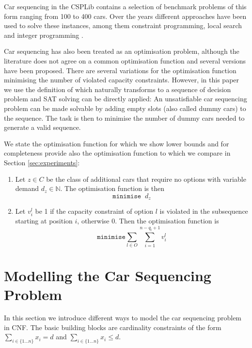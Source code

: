 \documentclass[]{easychair}
\def\min{{\texttt{minimise}}}
\begin{document}
Car sequencing in the CSPLib contains a selection of benchmark problems of this form ranging from 100 to 400 cars. Over
the years different approaches have been used to solve these instances, among them constraint programming, local search
and integer programming \cite{Regin97}\cite{Gottlieb03}\cite{Gravel05}\cite{Estellon06}\cite{Siala12}.

Car sequencing has also been treated as an optimisation problem, although the literature does not agree on a common
optimisation function and several versions have been proposed. There are several variations for the optimisation
function minimising the number of violated capacity constraints. However, in this paper we use the definition of
\cite{Perron04} which naturally transforms to a sequence of decision problem and SAT solving can be directly applied:
An unsatisfiable car sequencing problem can be made solvable by adding empty slots (also called dummy cars) to
the sequence. The task is then to minimise the number of dummy cars needed to generate a valid sequence.
          
We state the optimisation function for which we show lower bounds and for completeness provide also the optimisation
function to which we compare in Section \ref{sec:experiments}: 

\begin{enumerate} 
    \item Let $z\in C$ be the class of additional cars that require no options with variable demand $d_z \in
    \mathbb{N}$. The optimisation function is then $$\min \;\; d_z$$
    \item Let $v^l_{i}$ be 1 if the capacity constraint of option $l$ is violated in the subsequence starting at
        position $i$, otherwise 0. Then the optimisation function is $$\min \sum_{l\in O} \sum_{i=1}^{n-q_l+1} v_i^l$$
\end{enumerate} 


\section{Modelling the Car Sequencing Problem}
\label{sec:modelling}

In this section we introduce different ways to model the car sequencing problem in CNF. The basic building blocks are
cardinality constraints of the form $\sum_{i\in \{1\ldots n\}} x_{i} = d$ and $ \sum_{i\in \{1\ldots n\}} x_{i} \leq d
$.
\end{document}
